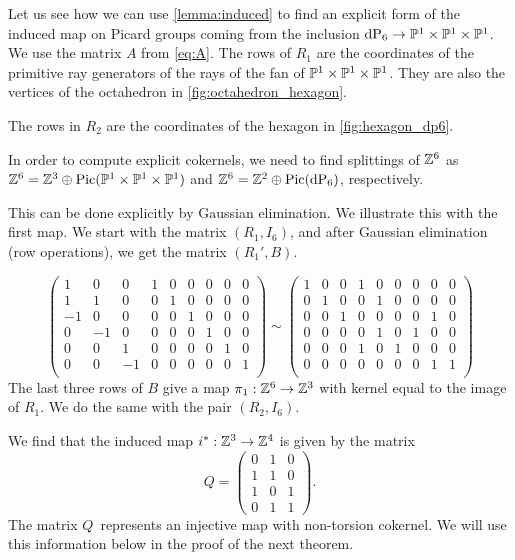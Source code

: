 \begin{example}
\label{example:p1p1p1}

Let us see how we can use \cref{lemma:induced} to find an explicit form of the induced map on Picard groups coming from the inclusion $\dP6 \to \P^1 \times \P^1 \times \P^1$. We use the matrix $A$ from \cref{eq:A}. The rows of $R_1$ are the coordinates of the primitive ray generators of the rays of the fan of $\P^1 \times \P^1 \times  \P^1$. They are also the vertices of the octahedron in \cref{fig:octahedron_hexagon}.


The rows in $R_2$ are the coordinates of the hexagon in \cref{fig:hexagon_dp6}.

In order to compute explicit cokernels, we need to find splittings of $\Z^6$ as $\Z^6 = \Z^3 \oplus \Pic (\P^1 \times \P^1 \times \P^1)$ and $\Z^6 = \Z^2 \oplus \Pic(\dP6)$, respectively.

This can be done explicitly by Gaussian elimination. We illustrate this with the first map. We start with the matrix $(R_1,I_6)$, and after Gaussian elimination (row operations), we get the matrix $(R_1',B)$.

\[
\left(
\begin{array}{ccc|cccccc}
1 & 0 & 0  & 1 & 0 & 0 & 0 & 0 & 0 \\
1 & 1 & 0  & 0 & 1 & 0 & 0 & 0 & 0 \\
-1& 0 & 0  & 0 & 0 & 1 & 0 & 0 & 0 \\
0 &-1 & 0  & 0 & 0 & 0 & 1 & 0 & 0 \\
0 & 0 & 1  & 0 & 0 & 0 & 0 & 1 & 0 \\
0 & 0 &-1  & 0 & 0 & 0 & 0 & 0 & 1 \\
\end{array} \right)
\sim \left(
\begin{array}{ccc|cccccc}
1 & 0 & 0  & 1 & 0 & 0 & 0 & 0 & 0 \\
0 & 1 & 0  & 0 & 1 & 0 & 0 & 0 & 0 \\
0 & 0 & 1  & 0 & 0 & 0 & 0 & 1 & 0 \\
0 & 0 & 0  & 0 & 1 & 0 & 1 & 0 & 0 \\
0 & 0 & 0  & 1 & 0 & 1 & 0 & 0 & 0 \\
0 & 0 & 0  & 0 & 0 & 0 & 0 & 1 & 1 \\
\end{array}\right)
\]
The last three rows of $B$ give a map $\pi_1: \Z^6 \to \Z^3$ with kernel equal to the image of $R_1$. We do the same with the pair $(R_2,I_6)$.

We find that the induced map $i^\ast: \Z^3 \to \Z^4$ is given by the matrix
\[
Q = \begin{pmatrix}
0 & 1 & 0 \\
1 & 1 & 0 \\
1 & 0 & 1 \\
0 & 1 & 1
\end{pmatrix}. 
\]
The matrix $Q$ represents an injective map with non-torsion cokernel. We will use this information below in the proof of the next theorem.
\end{example}

